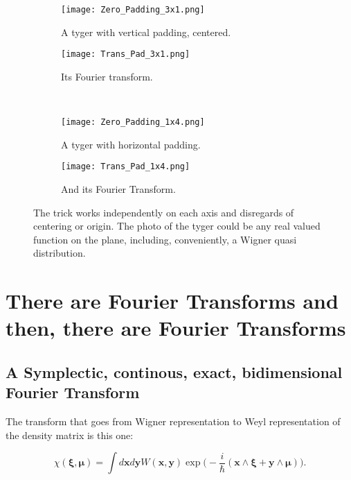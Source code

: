 \documentclass[a4paper,12pt]{article}
\newcommand{\ihb}{\frac{i}{\hbar}}
\newcommand{\xfase}{\mathbf{x}}
\newcommand{\yfase}{\mathbf{y}}
\newcommand{\xifase}{ {\boldsymbol{\xi}} }
\newcommand{\mufase}{ {\boldsymbol{\mu}} }
\begin{document}
\begin{figure}[h]
  \centering
  \begin{subfigure}[b]{0.48\textwidth}
    \centering
          \texttt{[image: Zero\_Padding\_3x1.png]}
                \caption{A tyger with vertical padding, centered.}
                \label{tigrevert01}
  \end{subfigure}%
\begin{subfigure}[b]{0.48\textwidth}
    \centering
          \texttt{[image: Trans\_Pad\_3x1.png]}
                \caption{Its Fourier transform.}
                \label{ftigrevert01}
  \end{subfigure}
\\
  \begin{subfigure}[b]{0.48\textwidth}
    \centering
          \texttt{[image: Zero\_Padding\_1x4.png]}
                \caption{A tyger with horizontal padding.}
                \label{ftigrehor01}
  \end{subfigure}%
\begin{subfigure}[b]{0.48\textwidth}
    \centering
          \texttt{[image: Trans\_Pad\_1x4.png]}
                \caption{And its Fourier Transform.}
                \label{ftigrehor01}
  \end{subfigure} 
\caption{ The trick works independently on each axis and
disregards of centering or origin. The photo of the tyger
could be any real valued function on the plane, including,
conveniently, a Wigner quasi distribution.
 }\label{ZoomTrick03}
\end{figure}


\section{ There are Fourier Transforms and then, there are Fourier Transforms}

\subsection{A Symplectic, continous, exact, bidimensional Fourier Transform}

The transform that goes from Wigner representation to Weyl representation
of the density matrix is this one:

\begin{equation}
\chi(\xifase, \mufase)=\int d\xfase d \yfase
W(\xfase,\yfase)\exp \big(-\ihb (\xfase\wedge \xifase+\yfase\wedge \mufase) \big).
\end{equation}
\end{document}

